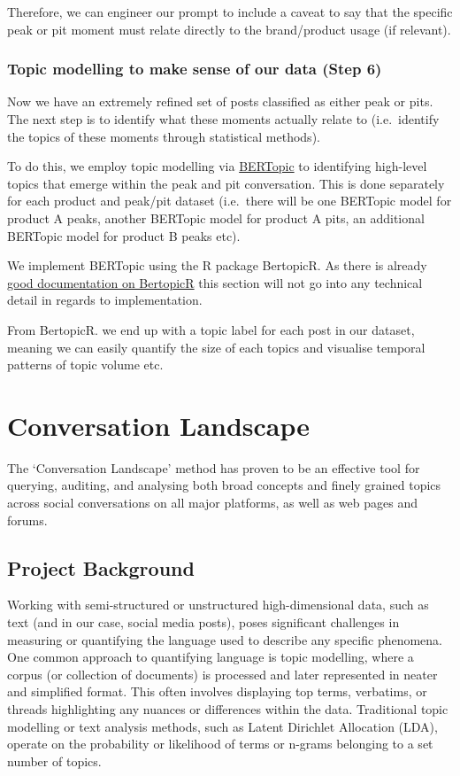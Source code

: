 \documentclass[
  letterpaper,
  DIV=11,
  numbers=noendperiod]{scrreprt}
\begin{document}
Therefore, we can engineer our prompt to include a caveat to say that
the specific peak or pit moment must relate directly to the
brand/product usage (if relevant).

\subsection{Topic modelling to make sense of our data (Step
6)}\label{step-six}

Now we have an extremely refined set of posts classified as either peak
or pits. The next step is to identify what these moments actually relate
to (i.e.~identify the topics of these moments through statistical
methods).

To do this, we employ topic modelling via
\href{https://maartengr.github.io/BERTopic/index.html}{BERTopic} to
identifying high-level topics that emerge within the peak and pit
conversation. This is done separately for each product and peak/pit
dataset (i.e.~there will be one BERTopic model for product A peaks,
another BERTopic model for product A pits, an additional BERTopic model
for product B peaks etc).

We implement BERTopic using the R package BertopicR. As there is already
\href{https://aoiferyan-sc.github.io/BertopicR/}{good documentation on
BertopicR} this section will not go into any technical detail in regards
to implementation.

From BertopicR. we end up with a topic label for each post in our
dataset, meaning we can easily quantify the size of each topics and
visualise temporal patterns of topic volume etc.

\chapter{Conversation Landscape}\label{conversation-landscape}

The `Conversation Landscape' method has proven to be an effective tool
for querying, auditing, and analysing both broad concepts and finely
grained topics across social conversations on all major platforms, as
well as web pages and forums.

\section{Project Background}\label{project-background}

Working with semi-structured or unstructured high-dimensional data, such
as text (and in our case, social media posts), poses significant
challenges in measuring or quantifying the language used to describe any
specific phenomena. One common approach to quantifying language is topic
modelling, where a corpus (or collection of documents) is processed and
later represented in neater and simplified format. This often involves
displaying top terms, verbatims, or threads highlighting any nuances or
differences within the data. Traditional topic modelling or text
analysis methods, such as Latent Dirichlet Allocation (LDA), operate on
the probability or likelihood of terms or n-grams belonging to a set
number of topics.
\end{document}
